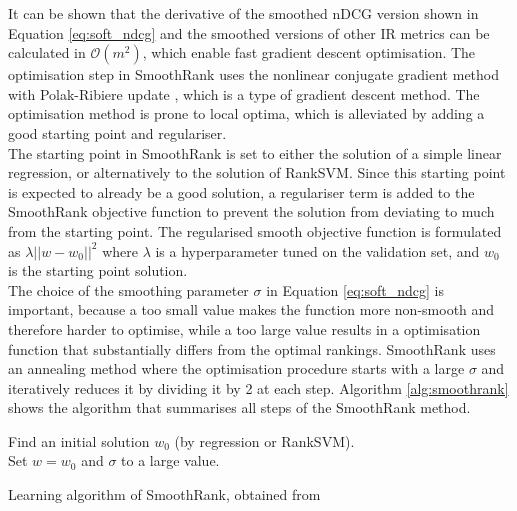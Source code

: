 It can be shown that the derivative of the smoothed \ac{nDCG} version shown in Equation \ref{eq:soft_ndcg} and the smoothed versions of other \ac{IR} metrics can be calculated in $\mathcal{O}(m^2)$, which enable fast gradient descent optimisation. The optimisation step in SmoothRank uses the nonlinear conjugate gradient method  with Polak-Ribiere update \cite{Shewchuk1994}, which is a type of gradient descent method. The optimisation method is prone to local optima, which is alleviated by adding a good starting point and regulariser.\\

The starting point in SmoothRank is set to either the solution of a simple linear regression, or alternatively to the solution of Rank\acs{SVM}. Since this starting point is expected to already be a good solution, a regulariser term is added to the SmoothRank objective function to prevent the solution from deviating to much from the starting point. The regularised smooth objective function is formulated as $\lambda||w-w_0||^2$ where $\lambda$ is a hyperparameter tuned on the validation set, and $w_0$ is the starting point solution.\\

The choice of the smoothing parameter $\sigma$ in Equation \ref{eq:soft_ndcg} is important, because a too small value makes the function more non-smooth and therefore harder to optimise, while a too large value results in a optimisation function that substantially differs from the optimal rankings. SmoothRank uses an annealing method where the optimisation procedure starts with a large $\sigma$ and iteratively reduces it by dividing it by 2 at each step. Algorithm \ref{alg:smoothrank} shows the algorithm that summarises all steps of the SmoothRank method.\\
\LinesNumbered
\begin{algorithm}[H]
 Find an initial solution $w_0$ (by regression or Rank\acs{SVM}).\\
 Set $w = w_0$ and $\sigma$ to a large value.\\
 \caption{Learning algorithm of SmoothRank, obtained from \cite{Chapelle2010}}
 \label{alg:smoothrank}
\end{algorithm}

